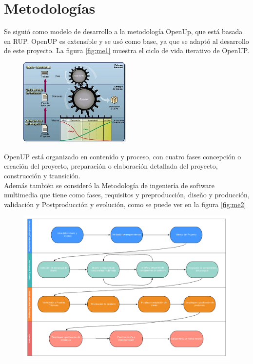 \section{Metodologías}
Se siguió como modelo de desarrollo a la metodología OpenUp\cite{balduino2007introduction}, 
que está basada en RUP. 
OpenUP es extensible y se usó como base, ya que se adaptó al desarrollo de este proyecto.
La figura \ref{fig:me1} muestra el ciclo de vida iterativo de OpenUP.
\begin{figure}[H]
	\begin{center}
 		\includegraphics[width = 0.5\textwidth]{source/images/image70.png}
	\end{center} 
\end{figure}
OpenUP está organizado en contenido y proceso, con cuatro fases concepción o creación del proyecto, preparación o elaboración detallada del proyecto, construcción y transición.\\
Además también se consideró la Metodología de ingeniería de software multimedia que tiene como fases, requisitos y preproducción, diseño y producción, validación y 
Postproducción y evolución, como se puede ver en la figura \ref{fig:me2}
\begin{figure}[H]
	\begin{center}
 		\includegraphics[width = 1\textwidth]{source/images/image50.png}
	\end{center} 
\end{figure}
